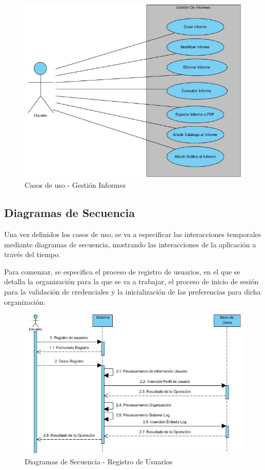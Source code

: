 \documentclass[a4paper,11pt]{book}
\begin{document}
\begin{figure}[H] 
\centering 
\includegraphics[scale=0.50]{imagenes/casosUso/Informe.jpg}
\caption{ Casos de uso - Gestión Informes  }  
\end{figure}

\subsection{Diagramas de Secuencia}
Una vez definidos los casos de uso, se va a especificar las interacciones temporales mediante diagramas de secuencia, mostrando las interacciones de la aplicación a través del tiempo. 

Para comenzar, se especifica el proceso de registro de usuarios, en el que se detalla la organización para la que se va a trabajar, el proceso de inicio de sesión para la validación de credenciales y la inicialización de las preferencias para dicha organización:

\begin{figure}[H] 
\centering 
\includegraphics[scale=0.50]{imagenes/secuencia/Registro_Usuario.jpg}
\caption{ Diagramas de Secuencia - Registro de Usuarios\cite{diagrama}  }  
\end{figure}
\end{document}
